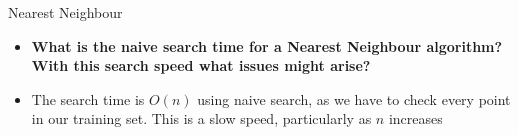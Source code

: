 \documentclass{beamer}
\begin{document}
%
\begin{frame}{Nearest Neighbour}
    \begin{itemize}
        \item<1-> \textbf{What is the naive search time for a Nearest Neighbour algorithm? With this search speed what issues might arise?}
        \item<2-> The search time is $O(n)$ using naive search, as we have to check every point in our training set. This is a slow speed, particularly as $n$ increases
    \end{itemize}
\end{frame}
\end{document}
